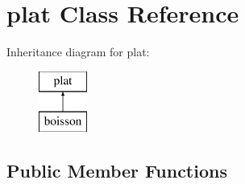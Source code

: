 \hypertarget{classplat}{}\section{plat Class Reference}
\label{classplat}
Inheritance diagram for plat\+:\begin{figure}[H]
\begin{center}
\leavevmode
\includegraphics[height=2.000000cm]{classplat}
\end{center}
\end{figure}
\subsection*{Public Member Functions}

